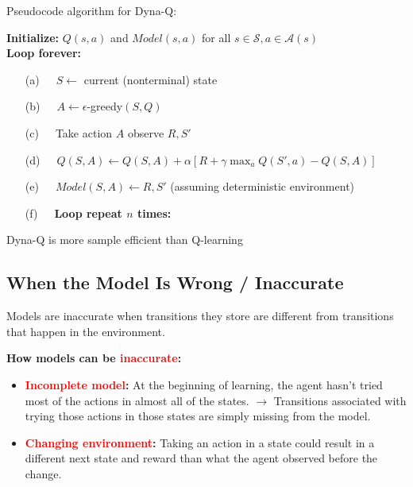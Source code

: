 \documentclass[12pt, a4paper]{article}
\begin{document}
Pseudocode algorithm for Dyna-Q:

\begin{tcolorbox}[title={Tabular Dyna-Q}]

\textbf{Initialize:} $Q(s, a)$ and $Model(s, a)$ for all $s \in \mathcal{S}, a \in \mathcal{A}(s)$ \\

\textbf{Loop forever:}
\begin{itemize}
   \item[(a)] $\;\;\;$ $S \leftarrow$ current (nonterminal) state
   \item[(b)] $\;\;\;$ $A \leftarrow \epsilon$-greedy$(S,Q)$
   \item[(c)] $\;\;\;$ Take action $A$ observe $R, S'$
   \item[(d)] $\;\;\;$ $Q(S, A) \leftarrow Q(S, A) + \alpha [R + \gamma \max_a Q(S', a) - Q(S, A)]$
   \item[(e)] $\;\;\;$ $Model(S, A) \leftarrow R, S'$ (assuming deterministic environment)
   \item[(f)] $\;\;\;$ \textbf{Loop repeat $n$ times:}
\end{itemize}
\end{tcolorbox}

Dyna-Q is more sample efficient than Q-learning










\subsection{When the Model Is Wrong / Inaccurate}\label{wrong-model}

Models are inaccurate when transitions they store are different from transitions that happen in the environment.

\textbf{How models can be \textcolor{red}{inaccurate}:}
\begin{itemize}
  \item \textbf{\textcolor{red}{Incomplete model}:} At the beginning of learning, the agent hasn't tried most of the actions in almost all of the states. $\rightarrow$ Transitions associated with trying those actions in those states are simply missing from the model.
  \item \textbf{\textcolor{red}{Changing environment}:} Taking an action in a state could result in a different next state and reward than what the agent observed before the change.
\end{itemize}
\end{document}
